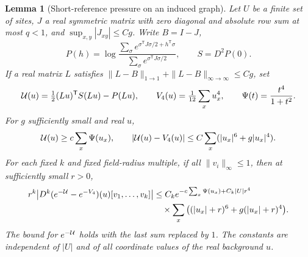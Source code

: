 \documentclass[11pt]{article}
\newtheorem{lemma}[theorem]{Lemma}
\theoremstyle{definition}
\begin{document}
\begin{lemma}[Short-reference pressure on an induced graph]
\label{lem:pressure-singleton}
Let \(U\) be a finite set of sites, \(J\) a real symmetric
matrix with zero diagonal and absolute row sum at most \(q<1\),
and \(\sup_{x,y}|J_{xy}|\le Cg\). Write
\(B=I-J\),
\begin{equation}
 P(h)=\log\frac{\sum_\sigma e^{\sigma^{\mathsf T} J\sigma/2+h^{\mathsf T}\sigma}}
                         {\sum_\sigma e^{\sigma^{\mathsf T}J\sigma/2}},
 \qquad S=D^2P(0).
\end{equation}
If a real matrix \(L\) satisfies
\(\|L-B\|_{1\to1}+\|L-B\|_{\infty\to\infty}\le Cg\), set
\begin{equation}
 {\cal U}(u)=\tfrac12(Lu)^{\mathsf T}S(Lu)-P(Lu),\qquad
 V_4(u)=\tfrac1{12}\sum_xu_x^4,\qquad
 \Psi(t)=\frac{t^4}{1+t^2}.
\end{equation}
For \(g\) sufficiently small and real \(u\),
\begin{equation}
 {\cal U}(u)\ge c\sum_x\Psi(u_x),\qquad
 |{\cal U}(u)-V_4(u)|\le C\sum_x(|u_x|^6+g|u_x|^4).
\end{equation}
For each fixed \(k\) and fixed field-radius multiple, if all
\(\|v_i\|_\infty\le1\), then at sufficiently small \(r>0\),
\begin{equation}
 \begin{aligned}
 r^k\big|D^k(e^{-{\cal U}}-e^{-V_4})(u)[v_1,\ldots,v_k]\big|
 &\le C_k e^{-c\sum_x\Psi(u_x)+C_k|U|r^4}\\
 &\quad{}\times
     \sum_x\big((|u_x|+r)^6+g(|u_x|+r)^4\big).
 \end{aligned}
\end{equation}
The bound for \(e^{-{\cal U}}\) holds with the last sum replaced
by \(1\). The constants are independent of \(|U|\) and of all
coordinate values of the real background \(u\).
\end{lemma}
\end{document}
